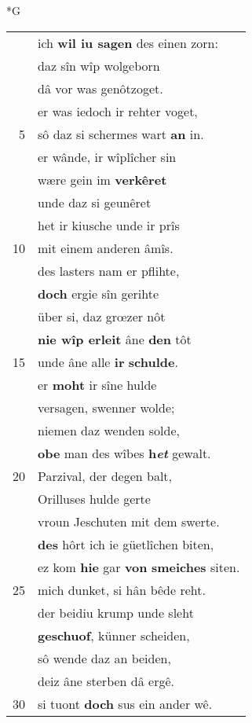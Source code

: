 \documentclass[8pt,a4paper,notitlepage]{article}
\begin{document}
\begin{table}[ht]
\begin{minipage}[t]{0.5\linewidth}
\small
\begin{center}*G
\end{center}
\begin{tabular}{rl}
 & ich \textbf{wil iu sagen} des einen zorn:\\ 
 & daz sîn wîp wolgeborn\\ 
 & dâ vor was genôtzoget.\\ 
 & er was iedoch ir rehter voget,\\ 
5 & sô daz si schermes wart \textbf{an} in.\\ 
 & er wânde, ir wîplîcher sin\\ 
 & wære gein im \textbf{verkêret}\\ 
 & unde daz si geunêret\\ 
 & het ir kiusche unde ir prîs\\ 
10 & mit einem anderen âmîs.\\ 
 & des lasters nam er pflihte,\\ 
 & \textbf{doch} ergie sîn gerihte\\ 
 & über si, daz grœzer nôt\\ 
 & \textbf{nie wîp erleit} âne \textbf{den} tôt\\ 
15 & unde âne alle \textbf{ir} \textbf{schulde}.\\ 
 & er \textbf{moht} ir sîne hulde\\ 
 & versagen, swenner wolde;\\ 
 & niemen daz wenden solde,\\ 
 & \textbf{obe} man des wîbes \textbf{h\textit{et}} gewalt.\\ 
20 & Parzival, der degen balt,\\ 
 & Orilluses hulde gerte\\ 
 & vroun Jeschuten mit dem swerte.\\ 
 & \textbf{des} hôrt ich ie güetlîchen biten,\\ 
 & ez kom \textbf{hie} gar \textbf{von} \textbf{smeiches} siten.\\ 
25 & mich dunket, si hân bêde reht.\\ 
 & der beidiu krump unde sleht\\ 
 & \textbf{geschuof}, künner scheiden,\\ 
 & sô wende daz an beiden,\\ 
 & deiz âne sterben dâ ergê.\\ 
30 & si tuont \textbf{doch} sus ein ander wê.\\ 

\end{tabular}
\end{minipage}
\end{table}
\end{document}

